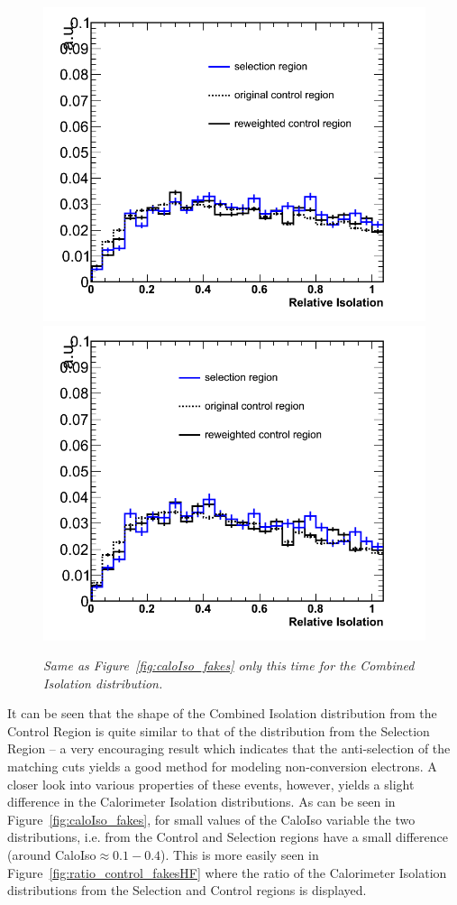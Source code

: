 \begin{figure}[h!]
\centering
\includegraphics[scale=0.32]{Plots/combIso_pt10_fakes.png}
\includegraphics[scale=0.32]{Plots/combIso_pt20_fakes.png}
\caption{\textit{Same as Figure~\ref{fig:caloIso_fakes} only this time for the Combined Isolation distribution.}}\label{fig:combIso_fakes}
\end{figure}

It can be seen that the shape of the Combined Isolation distribution from the Control Region is quite similar to that of the distribution from the Selection Region -- a very encouraging result which indicates that the anti-selection of the matching cuts yields a good method for modeling non-conversion electrons. A closer look into various properties of these events, however, yields a slight difference in the Calorimeter Isolation distributions.  As can be seen in Figure~\ref{fig:caloIso_fakes}, for small values of the CaloIso variable the two distributions, i.e. from the Control and Selection regions have a small difference (around CaloIso$\approx 0.1-0.4$).  This is more easily seen in Figure~\ref{fig:ratio_control_fakesHF} where the ratio of the Calorimeter Isolation distributions from the Selection and Control regions is displayed. 

